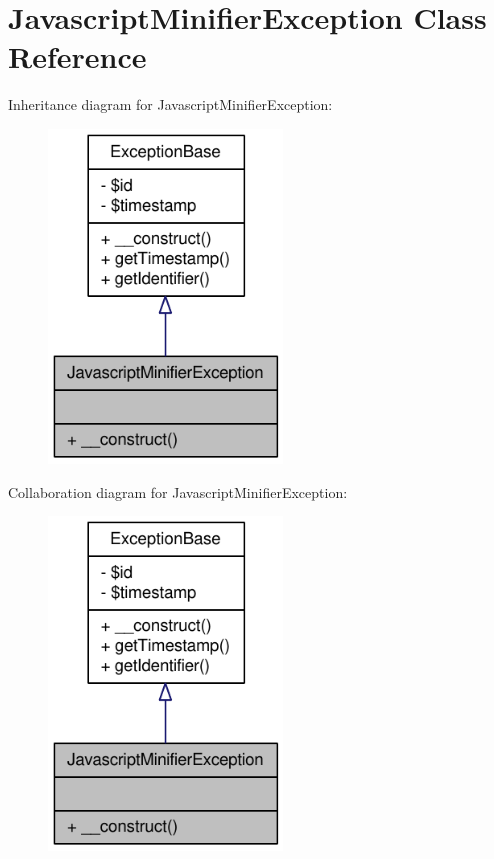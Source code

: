 \hypertarget{classJavascriptMinifierException}{
\section{JavascriptMinifierException Class Reference}
\label{classJavascriptMinifierException}
}


Inheritance diagram for JavascriptMinifierException:\nopagebreak
\begin{figure}[H]
\begin{center}
\leavevmode
\includegraphics[width=176pt]{classJavascriptMinifierException__inherit__graph}
\end{center}
\end{figure}


Collaboration diagram for JavascriptMinifierException:\nopagebreak
\begin{figure}[H]
\begin{center}
\leavevmode
\includegraphics[width=176pt]{classJavascriptMinifierException__coll__graph}
\end{center}
\end{figure}
